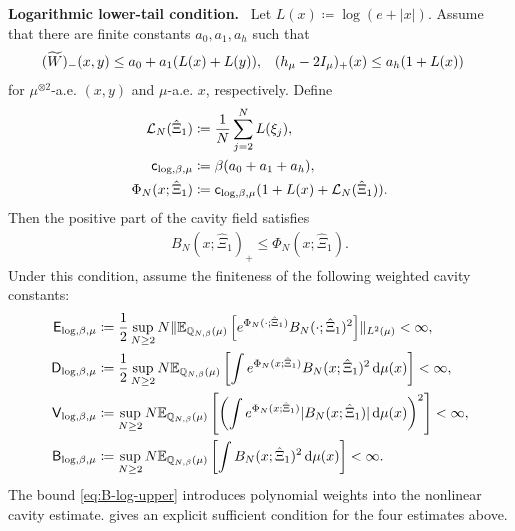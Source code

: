 \documentclass[11pt,reqno]{amsart}
\numberwithin{equation}{section}
\theoremstyle{plain}
\theoremstyle{remark}
\DeclarePairedDelimiter{\pa}{\lparen}{\rparen}
\DeclarePairedDelimiter{\norm}{\lVert}{\rVert}
\newcommand{\md}{\mathrm{d}}
\newcommand{\E}{{\mathbb{E}}}
\newcommand{\Q}{{\mathbb{Q}}}
\newcommand{\tl}{\widetilde}
\newcommand{\be}{\beta}
\newcommand{\parheading}[1]{\par\medskip\noindent\textbf{#1}\ }
\begin{document}
\parheading{Logarithmic lower-tail condition.}
Let \(L(x)\coloneqq\log(e+|x|)\).  Assume that there are finite constants \(a_0,a_1,a_h\) such that
\begin{align}\label{eq:cavity-tail-log}
 (\tl W)_-(x,y)&\le a_0+a_1\pa{L(x)+L(y)},
 &
 (h_\mu-2I_\mu)_+(x)&\le a_h\pa{1+L(x)}
\end{align}
for \(\mu^{\otimes2}\)-a.e. \((x,y)\) and \(\mu\)-a.e. \(x\), respectively.  Define
\begin{align}
 \mathcal L_N(\hat\Xi_1)&\coloneqq \frac1N\sum_{j=2}^N L(\xi_j),\label{eq:log-spatial-average}\\
 \mathsf c_{\log,\be,\mu}&\coloneqq \be(a_0+a_1+a_h),\label{eq:log-cavity-weight-constant}\\
 \Phi_N(x;\hat\Xi_1)&\coloneqq
 \mathsf c_{\log,\be,\mu}\pa{1+L(x)+\mathcal L_N(\hat\Xi_1)}.\label{eq:log-cavity-weight}
\end{align}
Then the positive part of the cavity field satisfies
\begin{align}\label{eq:B-log-upper}
 B_N(x;\hat\Xi_1)_+\le \Phi_N(x;\hat\Xi_1).
\end{align}
Under this condition, assume the finiteness of the following weighted cavity constants:
\begin{subequations}\label{eq:log-weighted-cavity-constants}
\begin{align}
 \mathsf E_{\log,\be,\mu}
 &\coloneqq
 \frac12\sup_{N\ge2}N
 \norm{\E_{\Q_{N,\be}(\mu)}\left[
 e^{\Phi_N(\cdot;\hat\Xi_1)}
 B_N(\cdot;\hat\Xi_1)^2\right]}_{L^2(\mu)}<\infty,\label{eq:log-weighted-cavity-E}\\
 \mathsf D_{\log,\be,\mu}
 &\coloneqq
 \frac12\sup_{N\ge2}N
 \E_{\Q_{N,\be}(\mu)}\left[
 \int e^{\Phi_N(x;\hat\Xi_1)}
 B_N(x;\hat\Xi_1)^2\,\md\mu(x)\right]<\infty,\label{eq:log-weighted-cavity-D}\\
 \mathsf V_{\log,\be,\mu}
 &\coloneqq
 \sup_{N\ge2}N
 \E_{\Q_{N,\be}(\mu)}\left[
 \left(\int e^{\Phi_N(x;\hat\Xi_1)}|B_N(x;\hat\Xi_1)|\,\md\mu(x)\right)^2\right]<\infty,\label{eq:log-weighted-cavity-V}\\
 \mathsf B_{\log,\be,\mu}
 &\coloneqq
 \sup_{N\ge2}N
 \E_{\Q_{N,\be}(\mu)}\left[
 \int B_N(x;\hat\Xi_1)^2\,\md\mu(x)\right]<\infty.\label{eq:log-weighted-cavity-B}
\end{align}
\end{subequations}
The bound \eqref{eq:B-log-upper} introduces polynomial weights into the nonlinear cavity estimate.   gives an explicit sufficient condition for the four estimates above.
\end{document}
